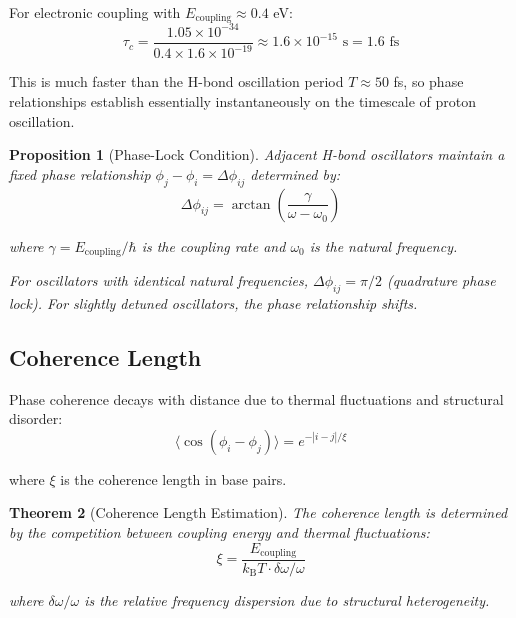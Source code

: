 \documentclass[twocolumn,10pt]{article}
\newtheorem{theorem}{Theorem}[section]
\newtheorem{proposition}[theorem]{Proposition}
\theoremstyle{remark}
\newcommand{\kB}{k_{\mathrm{B}}}
\begin{document}
For electronic coupling with $E_{\mathrm{coupling}} \approx 0.4$ eV:
\begin{equation}
\tau_c = \frac{1.05 \times 10^{-34}}{0.4 \times 1.6 \times 10^{-19}} \approx 1.6 \times 10^{-15} \text{ s} = 1.6 \text{ fs}
\end{equation}

This is much faster than the H-bond oscillation period $T \approx 50$ fs, so phase relationships establish essentially instantaneously on the timescale of proton oscillation.

\begin{proposition}[Phase-Lock Condition]
Adjacent H-bond oscillators maintain a fixed phase relationship $\phi_j - \phi_i = \Delta\phi_{ij}$ determined by:
\begin{equation}
\Delta\phi_{ij} = \arctan\left(\frac{\gamma}{\omega - \omega_0}\right)
\end{equation}

where $\gamma = E_{\mathrm{coupling}}/\hbar$ is the coupling rate and $\omega_0$ is the natural frequency.

For oscillators with identical natural frequencies, $\Delta\phi_{ij} = \pi/2$ (quadrature phase lock). For slightly detuned oscillators, the phase relationship shifts.
\end{proposition}

\subsection{Coherence Length}

Phase coherence decays with distance due to thermal fluctuations and structural disorder:
\begin{equation}
\langle \cos(\phi_i - \phi_j) \rangle = e^{-|i-j|/\xi}
\end{equation}

where $\xi$ is the coherence length in base pairs.

\begin{theorem}[Coherence Length Estimation]
The coherence length is determined by the competition between coupling energy and thermal fluctuations:
\begin{equation}
\xi = \frac{E_{\mathrm{coupling}}}{\kB T \cdot \delta\omega/\omega}
\end{equation}

where $\delta\omega/\omega$ is the relative frequency dispersion due to structural heterogeneity.
\end{theorem}
\end{document}
